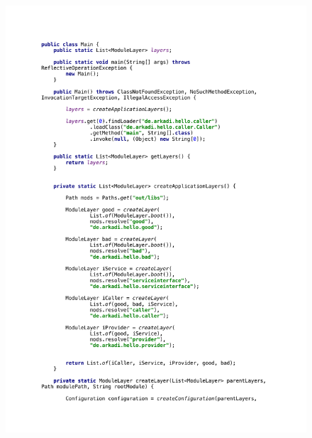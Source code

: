    \begin{figure}[]
      \centering
      \includegraphics[scale=0.9]{material/images/appendix/mainA.pdf}
      \label{fig:starterA}
    \end{figure}


